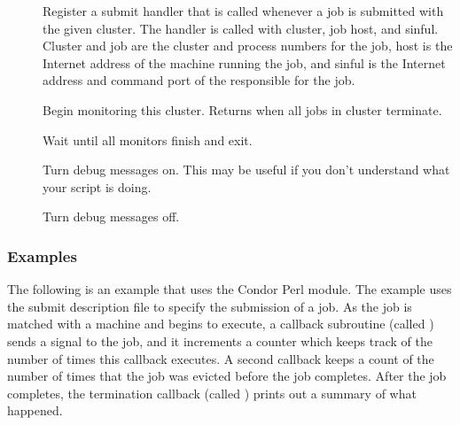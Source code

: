 \begin{description}
	\item []
	Register a submit handler that is called whenever a job is submitted
	with the given cluster.  The handler is called with cluster, job 
	host, and sinful. Cluster and job are the cluster and
	process numbers for the job, host is the Internet address of the
	machine running the job, and sinful is the Internet address and
	command port of the  responsible for the job.

	\item []
	Begin monitoring this cluster. Returns when all jobs in cluster
	terminate.  \\
	
	\item []
	Wait until all monitors finish and exit.

	\item []
	Turn debug messages on.  This may be useful if you don't understand
	what your script is doing.	

	\item []
	Turn debug messages off.

\end{description}


\subsubsection{Examples}

The following is an example that uses the Condor Perl module.
The example uses the submit description file 
 to specify the submission of a job.
As the job is matched with a machine and begins to execute,
a callback  subroutine (called \verb@execute@)
sends a  signal to the job,
and it increments a counter which keeps track of the
number of times this callback executes.
A second callback keeps a count of the number of times
that the job was evicted before the job completes.
After the job completes, the termination
callback (called \verb@normal@) prints out a summary of what happened.

